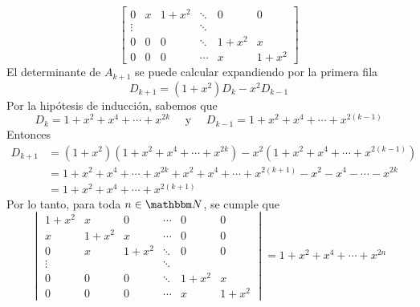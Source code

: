 \begin{example}
$$\begin{bmatrix}
        0 & x & 1 + x^2 & \ddots & 0 & 0 \\
        \vdots & & & \ddots & & \\
        0 & 0 & 0 & \ddots & 1 + x^2 & x \\
        0 & 0 & 0 & \cdots & x & 1 + x^2
    \end{bmatrix}$$
    El determinante de $A_{k+1}$ se puede calcular expandiendo por la primera fila
    $$D_{k+1} = (1 + x^2)D_k - x^2 D_{k-1}$$
    Por la hipótesis de inducción, sabemos que
    $$D_k = 1 + x^2 + x^4 + \cdots + x^{2k} \quad \text{ y } \quad D_{k-1} = 1 + x^2 + x^4 + \cdots + x^{2(k-1)}$$
    Entonces
    \begin{align*}
        D_{k+1} & = (1 + x^2)(1 + x^2 + x^4 + \cdots + x^{2k}) - x^2(1 + x^2 + x^4 + \cdots + x^{2(k-1)}) \\
        & = 1 + x^2 + x^4 + \cdots + x^{2k} + x^2 + x^4 + \cdots + x^{2(k+1)} - x^2 - x^4 - \cdots - x^{2k} \\
        & = 1 + x^2 + x^4 + \cdots + x^{2(k+1)}
    \end{align*}
    Por lo tanto, para toda $n \in \NN$, se cumple que
    $$\begin{vmatrix}
        1 + x^2 & x & 0 & \cdots & 0 & 0 \\
        x & 1 + x^2 & x & \cdots & 0 & 0 \\
        0 & x & 1 + x^2 & \ddots & 0 & 0 \\
        \vdots & & & \ddots & & \\
        0 & 0 & 0 & \ddots & 1 + x^2 & x \\
        0 & 0 & 0 & \cdots & x & 1 + x^2
    \end{vmatrix} = 1 + x^2 + x^4 + \cdots + x^{2n}$$
\end{example}


